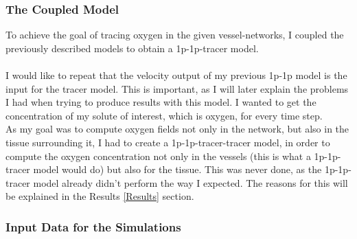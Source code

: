 \subsubsection*{The Coupled Model}

To achieve the goal of tracing oxygen in the given vessel-networks, I coupled the previously described models to obtain a 1p-1p-tracer model.\\
\\I would like to repeat that the velocity output of my previous 1p-1p model is the input for the tracer model. This is important, as I will later explain the problems I had when trying to produce results with this model. I wanted to get the concentration of my solute of interest, which is oxygen, for every time step.
\\As my goal was to compute oxygen fields not only in the network, but also in the tissue surrounding it, I had to create a 1p-1p-tracer-tracer model, in order to compute the oxygen concentration not only in the vessels (this is what a 1p-1p-tracer model would do) but also for the tissue. This was never done, as the 1p-1p-tracer model already didn't perform the way I expected. The reasons for this will be explained in the Results \ref{Results} section.

\subsubsection{Input Data for the Simulations}

